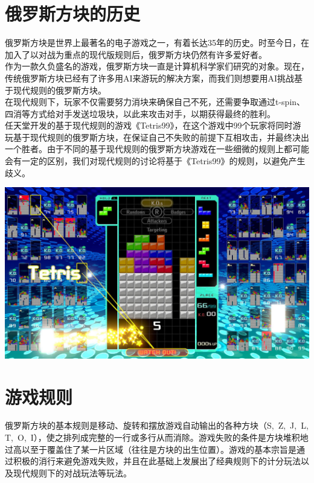 \documentclass[10pt,UTF8]{article}
\newenvironment{Figure}
  {\par\medskip\noindent\minipage{\linewidth}}
  {\endminipage\par\medskip}
\begin{document}
\begin{multicols}{2}

\section{俄罗斯方块的历史}

俄罗斯方块是世界上最著名的电子游戏之一，有着长达35年的历史。时至今日，在加入了以对战为重点的现代版规则后，俄罗斯方块仍然有许多爱好者。\\
作为一款久负盛名的游戏，俄罗斯方块一直是计算机科学家们研究的对象。现在，传统俄罗斯方块已经有了许多用AI来游玩的解决方案，而我们则想要用AI挑战基于现代规则的俄罗斯方块。\\
在现代规则下，玩家不仅需要努力消块来确保自己不死，还需要争取通过t-spin、四消等方式给对手发送垃圾块，以此来攻击对手，以期获得最终的胜利。\\
任天堂开发的基于现代规则的游戏《Tetris99》，在这个游戏中99个玩家将同时游玩基于现代规则的俄罗斯方块，在保证自己不失败的前提下互相攻击，并最终决出一个胜者。由于不同的基于现代规则的俄罗斯方块游戏在一些细微的规则上都可能会有一定的区别，我们对现代规则的讨论将基于《Tetris99》的规则，以避免产生歧义。
\begin{Figure}
    \centering
    \includegraphics[width=1\textwidth]{figure/Tetris99.png}
\end{Figure}

\section{游戏规则}

俄罗斯方块的基本规则是移动、旋转和摆放游戏自动输出的各种方块（S, Z, J, L, T, O, I），使之排列成完整的一行或多行从而消除。游戏失败的条件是方块堆积地过高以至于覆盖住了某一片区域（往往是方块的出生位置）。游戏的基本宗旨是通过积极的消行来避免游戏失败，并且在此基础上发展出了经典规则下的计分玩法以及现代规则下的对战玩法等玩法。


\end{multicols}
\end{document}

